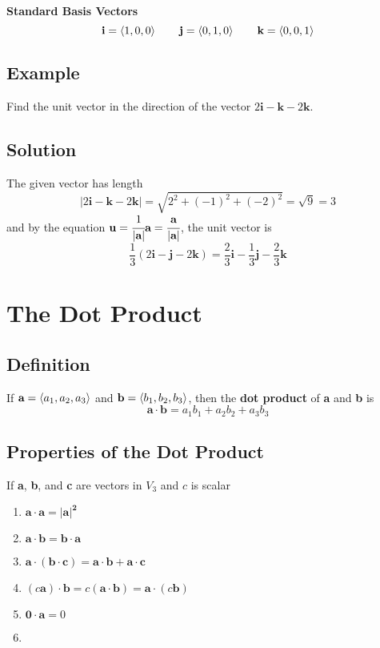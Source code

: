 \textbf{Standard Basis Vectors}
$$ \textbf{i}=\ev{1,0,0} \qquad \textbf{j}=\ev{0,1,0} \qquad \textbf{k}=\ev{0,0,1} $$

\subsection*{Example}
Find the unit vector in the direction of the vector $2\textbf{i}-\textbf{k}-2\textbf{k}$.

\subsection*{Solution}
The given vector has length
$$|2\textbf{i}-\textbf{k}-2\textbf{k}|=\sqrt{2^2+(-1)^2+(-2)^2}=\sqrt{9}=3$$
and by the equation $\textbf{u}=\cfrac{1}{|\textbf{a}|}\textbf{a}=\cfrac{\textbf{a}}{|\textbf{a}|}$,
the unit vector is
$$\frac{1}{3}(2\textbf{i}-\textbf{j}-2\textbf{k})=\frac{2}{3}\textbf{i}-
    \frac{1}{3}\textbf{j}-\frac{2}{3}\textbf{k}$$

\section{The Dot Product}

\subsection*{Definition}
If $\textbf{a}=\ev{a_1,a_2,a_3}$ and $\textbf{b}=\ev{b_1,b_2,b_3}$, then the
\textbf{dot product} of \textbf{a} and \textbf{b} is
$$\mathbf{a\cdot b}=a_1 b_1+a_2 b_2+a_3 b_3$$

\subsection*{Properties of the Dot Product}
If \textbf{a}, \textbf{b}, and \textbf{c} are vectors in $V_3$ and $c$ is scalar
\begin{multicols}{2}
    \begin{enumerate}
        \item $\mathbf{a\cdot a=|a|^2}$
        \item $\mathbf{a\cdot b=b\cdot a}$
        \item $\mathbf{a\cdot (b\cdot c)=a\cdot b+a\cdot c}$
        \item $(c\mathbf{a})\cdot\mathbf{b}=c(\mathbf{a\cdot b})=\mathbf{a}\cdot(c\mathbf{b})$
        \item $\mathbf{0\cdot a}=0$
        \item []
    \end{enumerate}
\end{multicols}

